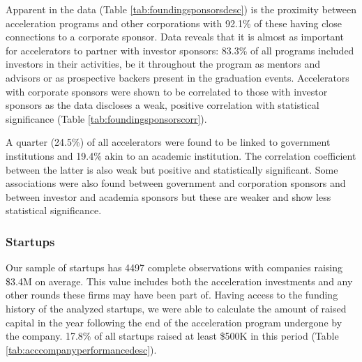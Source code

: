 \documentclass[
  12pt,
]{article}
\begin{document}

Apparent in the data (Table \ref{tab:foundingsponsorsdesc}) is the proximity between acceleration programs and other corporations with 92.1\% of these having close connections to a corporate sponsor. Data reveals that it is almost as important for accelerators to partner with investor sponsors: 83.3\% of all programs included investors in their activities, be it throughout the program as mentors and advisors or as prospective backers present in the graduation events. Accelerators with corporate sponsors were shown to be correlated to those with investor sponsors as the data discloses a weak, positive correlation with statistical significance (Table \ref{tab:foundingsponsorscorr}).

A quarter (24.5\%) of all accelerators were found to be linked to government institutions and 19.4\% akin to an academic institution. The correlation coefficient between the latter is also weak but positive and statistically significant. Some associations were also found between government and corporation sponsors and between investor and academia sponsors but these are weaker and show less statistical significance.

\hypertarget{analysisstartups}{%
\subsubsection{Startups}\label{analysisstartups}}

Our sample of startups has 4497 complete observations with companies raising \$3.4M on average. This value includes both the acceleration investments and any other rounds these firms may have been part of. Having access to the funding history of the analyzed startups, we were able to calculate the amount of raised capital in the year following the end of the acceleration program undergone by the company. 17.8\% of all startups raised at least \$500K in this period (Table \ref{tab:acccompanyperformancedesc}).

~

\onehalfspacing
\end{document}
